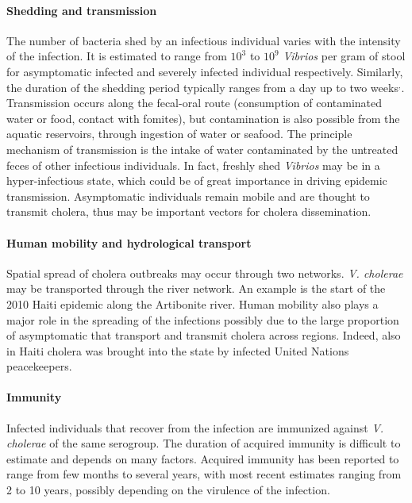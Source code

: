 \paragraph{Shedding and transmission} The number of bacteria shed by an infectious individual varies with the intensity of the infection. It is estimated to range from $10^3$ to $10^{9}$ \textit{Vibrios} per gram of stool for asymptomatic infected and severely infected individual respectively\footnotemark[18]. Similarly, the duration of the shedding period typically ranges from a day up to two weeks\footnotemark[17]$^{,}$\footnotemark[18].
Transmission occurs along the fecal-oral route (consumption of contaminated water or food, contact with fomites), but contamination is also possible from the aquatic reservoirs, through ingestion of water or seafood. The principle mechanism of transmission is the intake of water contaminated by the untreated feces of other infectious individuals. In fact, freshly shed \textit{Vibrios} may be in a hyper-infectious state, which could be of great importance in driving epidemic transmission\cite{Butler:CholeraStoolBacteria:2006}.
Asymptomatic individuals remain mobile and are thought to transmit cholera, thus may be important vectors for cholera dissemination.
\paragraph{Human mobility and hydrological transport} Spatial spread of cholera outbreaks may occur through two networks. \textit{V. cholerae} may be transported through the river network. An example is the start of the 2010 Haiti epidemic along the Artibonite river\cite{Piarroux:UnderstandingCholeraEpidemic:2011}. Human mobility also plays a major role in the spreading of the infections possibly due to the large proportion of asymptomatic that transport and transmit cholera across regions. Indeed, also in Haiti cholera was brought into the state by infected United Nations peacekeepers\cite{Piarroux:UnderstandingCholeraEpidemic:2011}. %

\paragraph{Immunity} Infected individuals that recover from the infection are immunized against \textit{V. cholerae}  of the same serogroup. The duration of acquired immunity is difficult to estimate and depends on many factors. Acquired immunity has been reported to range from few months to several years, with most recent estimates ranging from 2 to 10 years, possibly depending on the virulence of the infection\cite{Levine:DurationInfectionDerivedImmunity:1981,Kaper:Cholera:1995,Woodward:CholeraReinfectionMan:1971,Glass:SeroepidemiologicalStudiesEI:1985,Clemens:BiotypeDeterminantNatural:1991,Leung:ProtectionAffordedPrevious:2021}.

